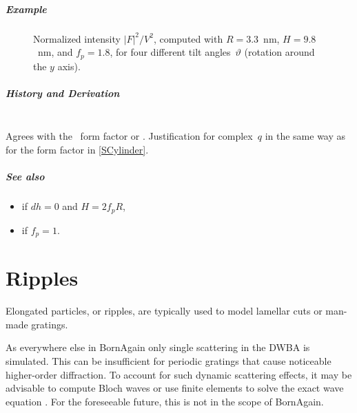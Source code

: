 \paragraph{Example}\strut

\begin{figure}[H]
\begin{center}
\end{center}
\caption{Normalized intensity $|F|^2/V^2$,
computed with $R=3.3$~nm, $H=9.8$~nm, and $f_p=1.8$,
for four different tilt angles~$\vartheta$ (rotation around the $y$ axis).}
\end{figure}

\paragraph{History and Derivation}\strut\\
Agrees with the \IsGISAXS\ form factor
 \cite[Eq.~2.33]{Laz06} or
 \cite[Eq.~228]{ReLL09}.
Justification for complex~$q$ in the same way as for the  form factor
in \cref{SCylinder}.

\paragraph{See also}
\begin{itemize}
\item {} if $dh=0$ and $H=2f_p R$,
\item {} if $f_p=1$.
\end{itemize}



\chapter{Ripples}\label{SRipple}

Elongated particles, or ripples, are typically used to model lamellar cuts or man-made gratings.

As everywhere else in BornAgain
only single scattering in the DWBA is simulated.
This can be insufficient for periodic gratings
that cause noticeable higher-order diffraction.
To account for such dynamic scattering effects,
it may be advisable to compute Bloch waves \cite{AsSW10}
or use finite elements to solve the exact wave equation \cite{SoFP17}.
For the foreseeable future, this is not in the scope of BornAgain.

